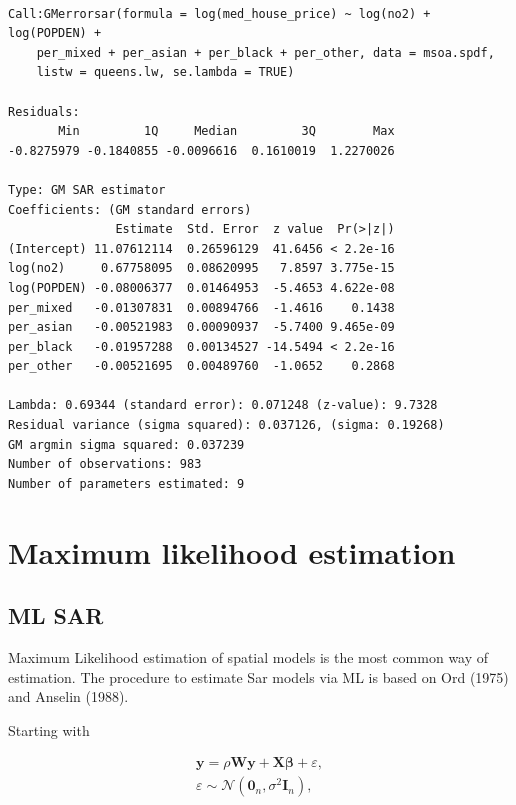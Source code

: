 \documentclass[
  letterpaper,
]{scrbook}
\begin{document}
\begin{verbatim}

Call:GMerrorsar(formula = log(med_house_price) ~ log(no2) + log(POPDEN) + 
    per_mixed + per_asian + per_black + per_other, data = msoa.spdf, 
    listw = queens.lw, se.lambda = TRUE)

Residuals:
       Min         1Q     Median         3Q        Max 
-0.8275979 -0.1840855 -0.0096616  0.1610019  1.2270026 

Type: GM SAR estimator
Coefficients: (GM standard errors) 
               Estimate  Std. Error  z value  Pr(>|z|)
(Intercept) 11.07612114  0.26596129  41.6456 < 2.2e-16
log(no2)     0.67758095  0.08620995   7.8597 3.775e-15
log(POPDEN) -0.08006377  0.01464953  -5.4653 4.622e-08
per_mixed   -0.01307831  0.00894766  -1.4616    0.1438
per_asian   -0.00521983  0.00090937  -5.7400 9.465e-09
per_black   -0.01957288  0.00134527 -14.5494 < 2.2e-16
per_other   -0.00521695  0.00489760  -1.0652    0.2868

Lambda: 0.69344 (standard error): 0.071248 (z-value): 9.7328
Residual variance (sigma squared): 0.037126, (sigma: 0.19268)
GM argmin sigma squared: 0.037239
Number of observations: 983 
Number of parameters estimated: 9 
\end{verbatim}

\hypertarget{maximum-likelihood-estimation}{%
\section{Maximum likelihood
estimation}\label{maximum-likelihood-estimation}}

\hypertarget{ml-sar}{%
\subsection{ML SAR}\label{ml-sar}}

Maximum Likelihood estimation of spatial models is the most common way
of estimation. The procedure to estimate Sar models via ML is based on
Ord (1975) and Anselin (1988).

Starting with

\[
\begin{split}
    \boldsymbol{\mathbf{y}}  = \rho \boldsymbol{\mathbf{W}}\boldsymbol{\mathbf{y}} + \boldsymbol{\mathbf{X}}\boldsymbol{\mathbf{\beta }}+ \varepsilon, \\
     \varepsilon  \sim \mathcal{N}(\boldsymbol{\mathbf{0}}_n , \sigma^2\boldsymbol{\mathbf{I}}_n),
\end{split}     
\]
\end{document}
